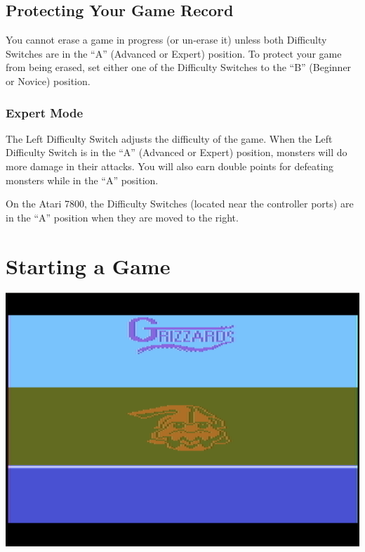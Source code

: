 \documentclass[9pt,twocolumn,openany,article]{memoir}
\begin{document}
\ifdefined\NOSAVE\else

\subsection{Protecting Your Game Record}

You  cannot erase  a  game  in progress  (or  un-erase  it) unless  both
Difficulty  Switches are  in the  ``A'' (Advanced  or Expert)  position.
To protect your game from being erased, set either one of the Difficulty
Switches to the ``B'' (Beginner or Novice) position.

\fi

\subsubsection*{Expert Mode}

The Left Difficulty Switch adjusts the  difficulty of the game. When the
Left Difficulty  Switch is in  the ``A'' (Advanced or  Expert) position,
monsters will do more damage in their attacks. You will also earn double
points for defeating monsters while in the ``A'' position.

On the Atari 7800, the  Difficulty Switches (located near the controller
ports) are in the ``A'' position when they are moved to the right.


\section{Starting a Game}

\begin{center}
  \includegraphics[width=.75\columnwidth]{../Manual/TitleAquaxNTSC.png}
\end{center}
\end{document}
